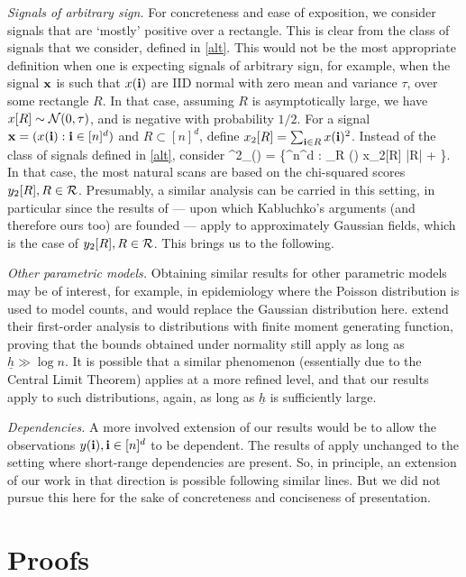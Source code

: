 \documentclass[twoside,11pt]{article}
\begin{document}
{\em Signals of arbitrary sign.}
For concreteness and ease of exposition, we consider signals that are `mostly' positive over a rectangle.  This is clear from the class of signals that we consider, defined in \eqref{alt}.  This would not be the most appropriate definition when one is expecting signals of arbitrary sign,  for example, when the signal $\mathbf{x}$ is such that $x(\mathbf{i})$ are IID normal with zero mean and variance $\tau$, over some rectangle $R$.  In that case, assuming $R$ is asymptotically large, we have $x[R] \sim \mathcal{N}(0, \tau)$, and is negative with probability $1/2$.
For a signal $\mathbf{x} = (x(\mathbf{i}) : \mathbf{i} \in [n]^d)$ and $R \subset [n]^d$, define $x_2[R] = \sum_{\mathbf{i} \in R} x(\mathbf{i})^2$.
Instead of the class of signals defined in \eqref{alt}, consider
\beq \label{alt-sign}
\Xcal^2_{\tau}(\hb) = \Big\{\xb \in \RR^{n^d} : \min_{R \in \Rcal(\hb)} x_2[R] \ge |R| + \tau {} \Big\}.
\eeq
In that case, the most natural scans are based on the chi-squared scores $y_2[R], R \in \mathcal{R}$.  Presumably, a similar analysis can be carried in this setting, in particular since the results of \cite{chan2006maxima} --- upon which Kabluchko's arguments (and therefore ours too) are founded --- apply to approximately Gaussian fields, which is the case of $y_2[R], R \in \mathcal{R}$.  This brings us to the following.

{\em Other parametric models.}
Obtaining similar results for other parametric models may be of interest, for example, in epidemiology where the Poisson distribution is used to model counts, and would replace the Gaussian distribution here.  \cite{cluster} extend their first-order analysis to distributions with finite moment generating function, proving that the bounds obtained under normality still apply as long as $\underline h \gg \log n$.  It is possible that a similar phenomenon (essentially due to the Central Limit Theorem) applies at a more refined level, and that our results apply to such distributions, again, as long as $\underline h$ is sufficiently large. 

{\em Dependencies.}
A more involved extension of our results would be to allow the observations  $y(\mathbf{i}), \mathbf{i} \in [n]^d$ to be dependent.  The results of \cite{chan2006maxima} apply unchanged to the setting where short-range dependencies are present.  So, in principle, an extension of our work in that direction is possible following similar lines.  But we did not pursue this here for the sake of concreteness and conciseness of presentation.  


\section{Proofs}
\label{sec:proofs}
\end{document}
